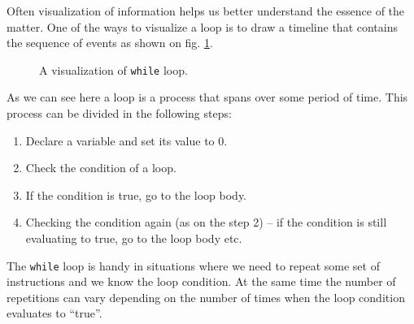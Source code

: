 \documentclass[../sparc.tex]{subfiles}
\begin{document}
Often visualization of information helps us better understand the essence of the
matter.  One of the ways to visualize a loop is to draw a timeline that contains
the sequence of events as shown on fig. \ref{fig:control-flow-while-loop}.

\begin{figure}[ht]
  \centering
  \label{fig:control-flow-while-loop}
  \caption{A visualization of \texttt{while} loop.}
\end{figure}

As we can see here a loop is a process that spans over some period of time.
This process can be divided in the following steps:

\begin{enumerate}
\item Declare a variable and set its value to 0.
\item Check the condition of a loop.
\item If the condition is true, go to the loop body.
\item Checking the condition again (as on the step 2) -- if the condition is
  still evaluating to true, go to the loop body etc.
\end{enumerate}

The \texttt{while} loop is handy in situations where we need to repeat some set
of instructions and we know the loop condition.  At the same time the number of
repetitions can vary depending on the number of times when the loop condition
evaluates to ``true''.
\end{document}

